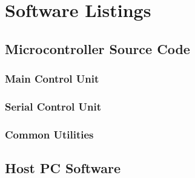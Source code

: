 \chapter{Software Listings}
\lstset{numbers=left, tabsize=2, breakatwhitespace=true}
\lstset{columns=fullflexible}
\lstset{breaklines=true}
\section[Controller Source]{Microcontroller Source Code}

\subsection{Main Control Unit}
\lstset{language=c}



\subsection{Serial Control Unit}


\subsection{Common Utilities}




\section{Host PC Software}
\lstset{language=python}



\lstset{language=matlab}


